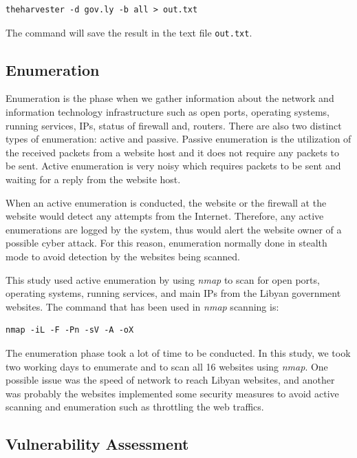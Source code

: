 \documentclass[conference]{IEEEtran}
\begin{document}
\begin{verbatim}
theharvester -d gov.ly -b all > out.txt
\end{verbatim}

The command will save the result in the text file
\verb|out.txt|. 



\subsection{Enumeration}

Enumeration is the phase when we gather information about the network
and information technology infrastructure such as open ports,
operating systems, running services, IPs, status of firewall and,
routers\cite{mehta2018penetration}. There are also two distinct types
of enumeration: active and passive. Passive enumeration is the
utilization of the received packets from a website host and it does
not require any packets to be sent.  Active enumeration is very noisy
which requires packets to be sent and waiting for a reply from the
website host.

When an active enumeration is conducted, the website or the firewall
at the website would detect any attempts from the Internet. Therefore,
any active enumerations are logged by the system, thus would alert the
website owner of a possible cyber attack. For this reason, enumeration
normally done in stealth mode to avoid detection by the websites being
scanned.

This study used active enumeration by using \emph{nmap}\cite{
  lyon2009nmap} to scan for open ports, operating systems, running
services, and main IPs from the Libyan government websites. The
command that has been used in \emph{nmap} scanning is:

\begin{verbatim}
nmap -iL -F -Pn -sV -A -oX
\end{verbatim}

The enumeration phase took a lot of time to be conducted. In this
study, we took two working days to enumerate and to scan all 16
websites using \emph{nmap}. One possible issue was the speed of
network to reach Libyan websites, and another was probably the
websites implemented some security measures to avoid active scanning
and enumeration such as throttling the web traffics.

\subsection{Vulnerability Assessment} 
\end{document}
